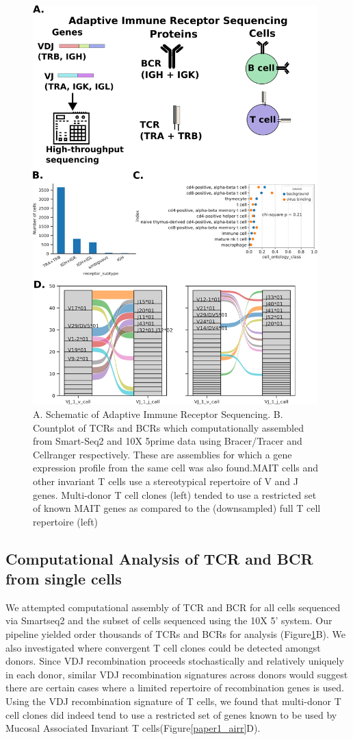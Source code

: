 \begin{figure}[hbt!]
\centering
\includegraphics[width=11cm, keepaspectratio]{figs/paper1/fig2_tabula_airr.png}
\caption[AIRR-seq for analyzing the T cell Repertoire in Tabula Sapiens]{A. Schematic of Adaptive Immune Receptor Sequencing. B. Countplot of TCRs and BCRs which computationally assembled from Smart-Seq2 and 10X 5prime data using Bracer/Tracer and Cellranger respectively. These are assemblies for which a gene expression profile from the same cell was also found.MAIT cells and other invariant T cells use a stereotypical repertoire of V and J genes. Multi-donor T cell clones (left) tended to use a restricted set of known MAIT genes as compared to the (downsampled) full T cell repertoire (left)}
\label{fig:paper1_airr}
\end{figure}



\subsection{Computational Analysis of TCR and BCR from single cells}
We attempted computational assembly of TCR and BCR for all cells sequenced via Smartseq2 and the subset of cells sequenced using the 10X 5' system. Our pipeline yielded order thousands of TCRs and BCRs for analysis (Figure\ref{fig:paper1_airr}B). We also investigated where convergent T cell clones could be detected amongst donors. Since VDJ recombination proceeds stochastically and relatively uniquely in each donor, similar VDJ recombination signatures across donors would suggest there are certain cases where a limited repertoire of recombination genes is used. Using the VDJ recombination signature of T cells, we found that multi-donor T cell clones did indeed tend to use a restricted set of genes known to be used by Mucosal Associated Invariant T cells(Figure\ref{paper1_airr}D). 

